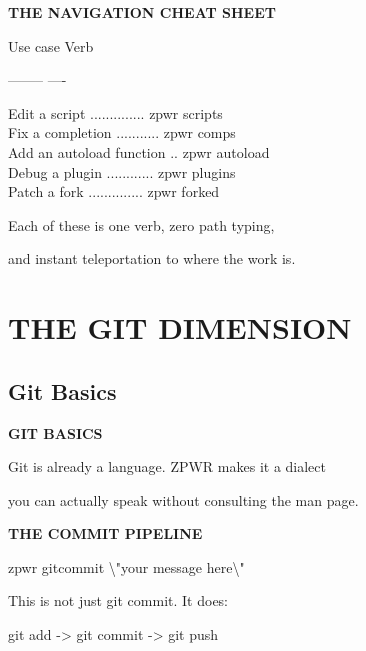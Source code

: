 \documentclass[11pt,a4paper,twoside]{book}
\begin{document}
\vspace{12pt}
{\bfseries\color{neonyellow} THE NAVIGATION CHEAT SHEET}\vspace{4pt}

Use case                      Verb

--------                      ----

\begin{codebox}
Edit a script .............. zpwr scripts\\
Fix a completion ........... zpwr comps\\
Add an autoload function .. zpwr autoload\\
Debug a plugin ............ zpwr plugins\\
Patch a fork .............. zpwr forked\\
\end{codebox}

Each of these is one verb, zero path typing,

and instant teleportation to where the work is.


\vspace{16pt}


\chapter{THE GIT DIMENSION}

\section{Git Basics}


\vspace{10pt}
{\large\bfseries\color{neoncyan} GIT BASICS}\vspace{6pt}

Git is already a language. ZPWR makes it a dialect

you can actually speak without consulting the man page.


\vspace{12pt}
{\bfseries\color{neonyellow} THE COMMIT PIPELINE}\vspace{4pt}

\begin{codebox}
zpwr gitcommit \textbackslash{}"your message here\textbackslash{}"\\
\end{codebox}

This is not just git commit. It does:

git add -> git commit -> git push
\end{document}
